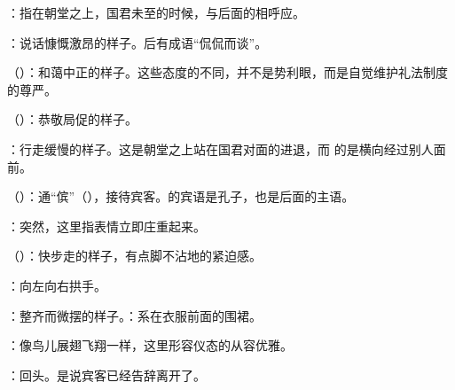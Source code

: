 {
\item {}：指在朝堂之上，国君未至的时候，与后面的相呼应。
\item {}：说话慷慨激昂的样子。后有成语“侃侃而谈”。
\item {}（）：和蔼中正的样子。这些态度的不同，并不是势利眼，而是自觉维护礼法制度的尊严。
\item {}（）：恭敬局促的样子。
\item {}：行走缓慢的样子。这是朝堂之上站在国君对面的进退，而  的是横向经过别人面前。
}
{}  %


{
\item {}（）：通“傧”（），接待宾客。的宾语是孔子，也是后面的主语。
\item {}：突然，这里指表情立即庄重起来。
\item {}（）：快步走的样子，有点脚不沾地的紧迫感。
\item {}：向左向右拱手。
\item {}：整齐而微摆的样子。：系在衣服前面的围裙。
\item {}：像鸟儿展翅飞翔一样，这里形容仪态的从容优雅。
\item {}：回头。是说宾客已经告辞离开了。
}
{}



